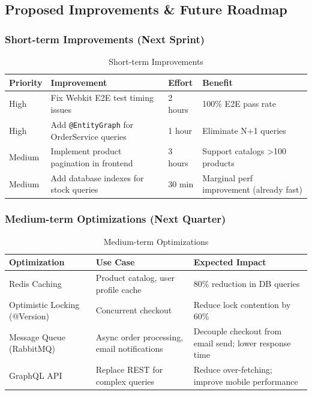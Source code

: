 \documentclass[11pt,a4paper]{article}
\begin{document}
\subsection{Proposed Improvements \& Future Roadmap}

\subsubsection{Short-term Improvements (Next Sprint)}

\begin{table}[H]
\centering
\small
\begin{tabularx}{\textwidth}{|l|X|l|X|}
\hline
\textbf{Priority} & \textbf{Improvement} & \textbf{Effort} & \textbf{Benefit} \\
\hline
High & Fix Webkit E2E test timing issues & 2 hours & 100\% E2E pass rate \\
\hline
High & Add \texttt{@EntityGraph} for OrderService queries & 1 hour & Eliminate N+1 queries \\
\hline
Medium & Implement product pagination in frontend & 3 hours & Support catalogs >100 products \\
\hline
Medium & Add database indexes for stock queries & 30 min & Marginal perf improvement (already fast) \\
\hline
\end{tabularx}
\caption{Short-term Improvements}
\end{table}

\subsubsection{Medium-term Optimizations (Next Quarter)}

\begin{table}[H]
\centering
\small
\begin{tabularx}{\textwidth}{|p{4.5cm}|X|X|}
\hline
\textbf{Optimization} & \textbf{Use Case} & \textbf{Expected Impact} \\
\hline
Redis Caching & Product catalog, user profile cache & 80\% reduction in DB queries \\
\hline
Optimistic Locking (@Version) & Concurrent checkout & Reduce lock contention by 60\% \\
\hline
Message Queue (RabbitMQ) & Async order processing, email notifications & Decouple checkout from email send; lower response time \\
\hline
GraphQL API & Replace REST for complex queries & Reduce over-fetching; improve mobile performance \\
\hline
\end{tabularx}
\caption{Medium-term Optimizations}
\end{table}
\end{document}
